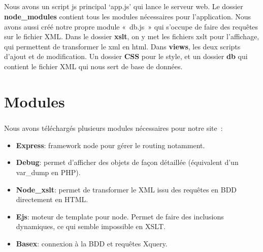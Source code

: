\documentclass{report}
\begin{document}
	\paragraph{}{
		Nous avons un script js principal ‘app.js’ qui lance le serveur web. Le dossier \textbf{node\_modules} contient tous les modules nécessaires pour l’application. Nous avons aussi créé notre propre module « db.js » qui s’occupe de faire des requêtes sur le fichier XML.  Dans le dossier \textbf{xslt}, on y met les fichiers xslt pour l’affichage, qui permettent de transformer le xml en html. Dans \textbf{views}, les deux scripts d’ajout et de modification. Un dossier \textbf{CSS} pour le style, et un dossier \textbf{db} qui contient le fichier XML qui nous sert de base de données.
	}



%
\chapter{Modules}
\thispagestyle{fancy}
	\paragraph{}{
		Nous avons téléchargés plusieurs modules nécessaires pour notre site : \\

		\begin{itemize}
			\item \textbf{Express}: framework node pour gérer le routing notamment.
			\item \textbf{Debug}: permet d’afficher des objets de façon détaillée (équivalent d’un var\_dump en PHP).
			\item \textbf{Node\_xslt}: permet de transformer le XML issu des requêtes en BDD directement en HTML.
			\item \textbf{Ejs}: moteur de template pour node. Permet de faire des inclusions dynamiques, ce qui semble impossible en XSLT.
			\item \textbf{Basex}: connexion à la BDD et requêtes Xquery.

		\end{itemize}
	}


%
\end{document}
